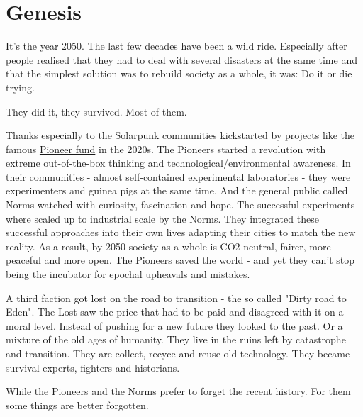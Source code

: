 \chapter{Genesis}

It's the year 2050. The last few decades have been a wild ride. Especially after people realised that they had to deal with several disasters at the same time and that the simplest solution was to rebuild society as a whole, it was: Do it or die trying.

They did it, they survived. Most of them.

Thanks especially to the Solarpunk communities kickstarted by projects like the famous \hyperref[ch:pioneer fund]{Pioneer fund} in the 2020s. The Pioneers started a revolution with extreme out-of-the-box thinking and technological/environmental awareness. In their communities - almost self-contained experimental laboratories - they were experimenters and guinea pigs at the same time. And the general public called Norms watched with curiosity, fascination and hope. The successful experiments where scaled up to industrial scale by the Norms. They integrated these successful approaches into their own lives adapting their cities to match the new reality.
As a result, by 2050 society as a whole is CO2 neutral, fairer, more peaceful and more open.
The Pioneers saved the world - and yet they can't stop being the incubator for epochal upheavals and mistakes.

A third faction got lost on the road to transition - the so called "Dirty road to Eden". The Lost saw the price that had to be paid and disagreed with it on a moral level. Instead of pushing for a new future they looked to the past. Or a mixture of the old ages of humanity. They live in the ruins left by catastrophe and transition. They are collect, recyce and reuse old technology. They became survival experts, fighters and historians.

While the Pioneers and the Norms prefer to forget the recent history. For them some things are better forgotten.